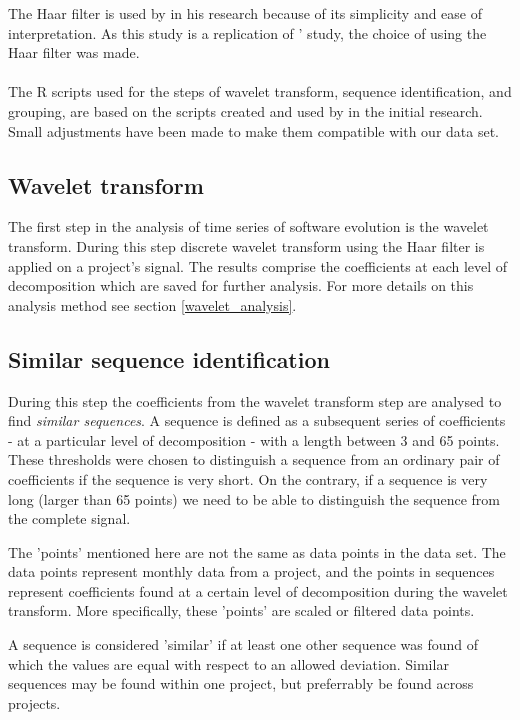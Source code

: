 The Haar filter is used by \citet{karus2013} in his research because of its
simplicity and ease of interpretation. As this study is a replication of
\citeauthor{karus2013}' study, the choice of using the Haar filter was made.

\paragraph{}
The R scripts used for the steps of wavelet transform, sequence identification,
and grouping, are based on the scripts created and used by
\citeauthor{karus2013} in the initial research. Small adjustments have been
made to make them compatible with our data set.

\subsection{Wavelet transform}
The first step in the analysis of time series of software evolution is the
wavelet transform. During this step discrete wavelet transform using the Haar
filter is applied on a project's signal. The results comprise the coefficients
at each level of decomposition which are saved for further analysis. For more
details on this analysis method see section \ref{wavelet_analysis}.

\subsection{Similar sequence identification}
During this step the coefficients from the wavelet transform step are
analysed to find \emph{similar sequences}\rm. A sequence is defined as a
subsequent series of coefficients - at a particular level of decomposition -
with a length between 3 and 65 points.
These thresholds were chosen to distinguish a sequence from an ordinary pair of
coefficients if the sequence is very short. On the contrary, if a sequence is
very long (larger than 65 points) we need to be able to distinguish the
sequence from the complete signal.

The 'points' mentioned here are not the same as data points in the data set.
The data points represent monthly data from a project, and the points in
sequences represent coefficients found at a certain level of decomposition
during the wavelet transform. More specifically, these 'points' are scaled or
filtered data points.

A sequence is considered 'similar' if at least one other sequence was found of
which the values are equal with respect to an allowed deviation. Similar
sequences may be found within one project, but preferrably be found across
projects.

